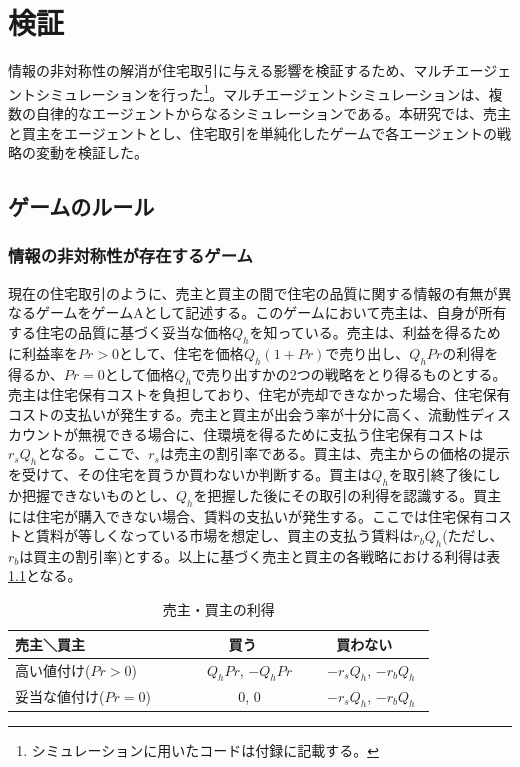 \documentclass[a4paper,fontsize=11pt,report,notitlepage,line_length=38zw,number_of_lines=40,dvipdfmx]{jlreq}
\begin{document}
\chapter{検証}
情報の非対称性の解消が住宅取引に与える影響を検証するため、マルチエージェントシミュレーションを行った\footnote{シミュレーションに用いたコードは付録に記載する。}。マルチエージェントシミュレーションは、複数の自律的なエージェントからなるシミュレーションである。本研究では、売主と買主をエージェントとし、住宅取引を単純化したゲームで各エージェントの戦略の変動を検証した。

\section{ゲームのルール}
\subsection{情報の非対称性が存在するゲーム}
現在の住宅取引のように、売主と買主の間で住宅の品質に関する情報の有無が異なるゲームをゲームAとして記述する。このゲームにおいて売主は、自身が所有する住宅の品質に基づく妥当な価格$Q_h$を知っている。売主は、利益を得るために利益率を$Pr>0$として、住宅を価格$Q_h(1+Pr)$で売り出し、$Q_hPr$の利得を得るか、$Pr=0$として価格$Q_h$で売り出すかの2つの戦略をとり得るものとする。売主は住宅保有コストを負担しており、住宅が売却できなかった場合、住宅保有コストの支払いが発生する。売主と買主が出会う率が十分に高く、流動性ディスカウントが無視できる場合に、住環境を得るために支払う住宅保有コストは$r_sQ_h$となる。ここで、$r_s$は売主の割引率である。買主は、売主からの価格の提示を受けて、その住宅を買うか買わないか判断する。買主は$Q_h$を取引終了後にしか把握できないものとし、$Q_h$を把握した後にその取引の利得を認識する。買主には住宅が購入できない場合、賃料の支払いが発生する。ここでは住宅保有コストと賃料が等しくなっている市場を想定し、買主の支払う賃料は$r_bQ_h$(ただし、$r_b$は買主の割引率)とする。以上に基づく売主と買主の各戦略における利得は表\ref{ritokuA}となる。

\begin{table}
\begin{center}
\caption{売主・買主の利得}
\label{ritokuA}
\begin{tabular}{l|cc}
売主＼買主 & 買う & 買わない \\ \hline
高い値付け($Pr>0$)　　 & 　$Q_hPr$,  $-Q_hPr$ & 　$-r_sQ_h$,  $-r_bQ_h$　 \\
妥当な値付け($Pr=0$)　　 & 　0, 0 & 　$-r_sQ_h$,  $-r_bQ_h$　
\end{tabular}
\end{center}
\end{table}%
\end{document}
